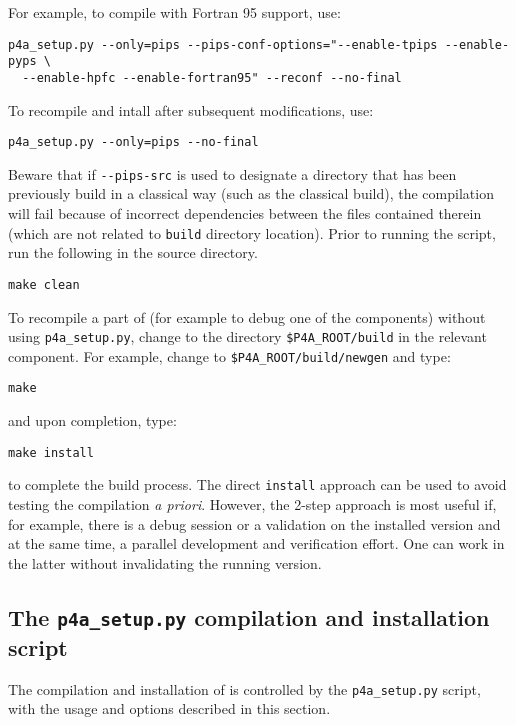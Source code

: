 \documentclass[a4paper]{article}
\begin{document}
For example, to compile \Apips with Fortran 95 support, use:
\begin{verbatim}
p4a_setup.py --only=pips --pips-conf-options="--enable-tpips --enable-pyps \
  --enable-hpfc --enable-fortran95" --reconf --no-final
\end{verbatim}

To recompile and intall \Apips after subsequent modifications, use:
\begin{verbatim}
p4a_setup.py --only=pips --no-final
\end{verbatim}

Beware that if \verb|--pips-src| is used to designate a \Apips
directory that has been previously build in a classical way (such as
the classical \Asvn build), the compilation will fail because of
incorrect dependencies between the files contained therein (which are not
related to \Apfa \texttt{build} directory location). Prior to running
the script, run the following in the \Apips source directory.
\begin{verbatim}
make clean
\end{verbatim}

To recompile a part of \Apfa (for example to debug
one of the components) without using \verb|p4a_setup.py|, change to
the directory \verb|$P4A_ROOT/build| in the relevant component. For
example, change to \verb|$P4A_ROOT/build/newgen| and type:
\begin{verbatim}
make
\end{verbatim}
and upon completion, type:
\begin{verbatim}
make install
\end{verbatim}
to complete the build process. The direct \texttt{install}
approach can be used to avoid testing the compilation
\emph{a priori}. However, the 2-step
approach is most useful if, for example, there is a debug session or a
validation on the installed version and at the same time, a parallel
development and verification effort. One can work in the latter
without invalidating the running version.

\subsection{The \protect\texttt{p4a\_setup.py} compilation and installation
script}
\label{sec:p4a_s-comp-script}

The compilation and installation of \Apfa is controlled by the
\verb|p4a_setup.py| script, with the usage and options described in
this section.
\end{document}
